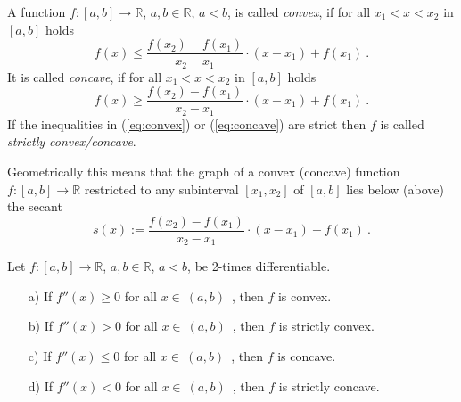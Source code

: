\begin{Definition} \label{def:convexity}
    A function $f:[a,b]\rightarrow \mathbb{R}$, $a,b\in\mathbb{R}$, $a<b$, is called \emph{convex}, if for all $x_1<x<x_2$ in $[a,b]$ holds
    \begin{equation}\label{eq:convex} 
      f(x) \leq \frac{f(x_2)-f(x_1)}{x_2-x_1}\cdot(x-x_1)+f(x_1)\ .      
    \end{equation}
    It is called \emph{concave}, if for all $x_1<x<x_2$ in $[a,b]$ holds
    \begin{equation}\label{eq:concave} 
      f(x)\geq \frac{f(x_2)-f(x_1)}{x_2-x_1}\cdot(x-x_1)+f(x_1)\ .
    \end{equation}
    If the inequalities in (\ref{eq:convex}) or (\ref{eq:concave}) are strict then $f$ is called \emph{strictly convex/concave}.
    
Geometrically this means that the graph of a convex (concave) function $f:[a,b]\rightarrow \mathbb{R}$ restricted to any subinterval 
$[x_1,x_2]$ of $[a,b]$ lies 
below (above) the secant $$s(x):=\frac{f(x_2)-f(x_1)}{x_2-x_1}\cdot(x-x_1)+f(x_1) \ .$$
\end{Definition}


\begin{Theorem}{} \label{th:convconc}
    Let $f:[a,b]\rightarrow \mathbb{R}$, $a,b\in\mathbb{R}$, $a<b$, be 2-times differentiable. 
  \begin{enumerate}
   \item[a)]   If $f''(x)\geq 0$ for all $x\in~(a,b)$~, then $f$ is convex.
   \item[b)]   If $f''(x)>0$ for all $x\in~(a,b)$~, then $f$ is strictly convex.
   \item[c)]   If $f''(x)\leq 0$ for all $x\in~(a,b)$~, then $f$ is concave.
   \item[d)]   If $f''(x)<0$ for all $x\in~(a,b)$~, then $f$ is strictly concave.
  \end{enumerate}
\end{Theorem}

